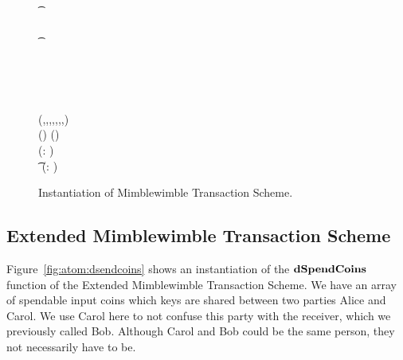\begin{figure}
\begin{center}
{\begin{varwidth}{\textwidth}
{            \pcif \procVerfProof{\varProofs[1]}{\varOutputs[1]}  \\
            \t \pcreturn \cnstFalsum \\
            \pcif \procVerfPtSig{\varSigBob}{\varMsg}{\varCommits[1]}  \\
            \t \pcreturn \cnstFalsum \\
            \varSigAlice \opFunResult \procSignPrt{\varMsg}{\varSecKeyAlice}{\varNonceAlice}{\varSigContext} \\
            \varSigFin \opFunResult \procFinSig{\varSigAlice}{\varSigBob} \\
            \varTx \opFunResult \procCreatePreTx{\varMsg}{\varInputs}{\varOutputs}{\varProofs}{\varSigContext}{\varCommits}{\varSigFin}{\varTime} \\
            \pcreturn \varTx
            } \\
            \procedure[linenumbering]{$\procVerfTx{\varTx}$} {
            (\varMsg,\varInputs,\varOutputs,\varProofs,\varSigContext,\varCommits,\varSignature,\varTime) \opFunResult \varTx \\
            \varExcess \opEqNoQ \sum(\varOutputs) \opSub \sum(\varInputs) \\
            \pcreturn (\opForAll \varI \opNotEq \varJ : \varInputs[\varI] \opNotEq \varInputs[\varJ] \opAnd \varOutputs[\varI] \opNotEq \varOutputs[\varJ])  \pcskipln \\
                \t \varInputs \opUnion \varOutputs \opEqNoQ \cnstEmptySet {} (\opForAll \varI : \procVerfProof{\varProofs[\varI]}{\varOutputs[\varI]})  \procVerf{\varMsg}{\varSignature}{\varExcess}
            }
        \end{varwidth}
        }
    \end{center}
    \caption{Instantiation of Mimblewimble Transaction Scheme. \label{fig:inst-mw-tx}}
\end{figure}

\subsection{Extended Mimblewimble Transaction Scheme}\label{subsec:atom:ext-tx-scheme}

Figure~\cref{fig:atom:dsendcoins} shows an instantiation of the $\mathbf{dSpendCoins}$ function of the Extended Mimblewimble Transaction Scheme.
We have an array of spendable input coins which keys are shared between two parties Alice and Carol.
We use Carol here to not confuse this party with the receiver, which we previously called Bob.
Although Carol and Bob could be the same person, they not necessarily have to be.


